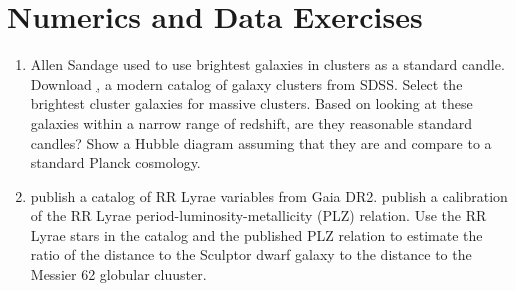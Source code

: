 \section{Numerics and Data Exercises}

\begin{enumerate}
\item Allen Sandage used to use brightest galaxies in clusters as a
   standard
   candle. Download \href{https://cdsarc.cds.unistra.fr/viz-bin/cat/J/ApJS/224/1#/description},
   a modern catalog of galaxy clusters from SDSS. Select the brightest
   cluster galaxies for massive clusters. Based on looking at these
   galaxies within a narrow range of redshift, are they reasonable
   standard candles? Show a Hubble diagram assuming that they are and
   compare to a standard Planck cosmology.
\item \citet{clementini18a} publish a catalog of RR Lyrae variables
   from Gaia DR2. \citet{muraveva18a} publish a calibration of the RR
   Lyrae period-luminosity-metallicity (PLZ) relation. Use the RR
   Lyrae stars in the catalog and the published PLZ relation to
   estimate the ratio of the distance to the Sculptor dwarf galaxy to
   the distance to the Messier 62 globular cluuster.
\end{enumerate}


  
